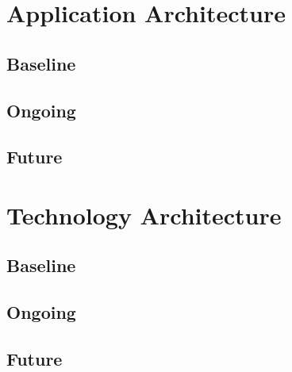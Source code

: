 \section{Application Architecture}
\subsection{Baseline}
\subsection{Ongoing}
\subsection{Future}


\section{Technology Architecture}
\subsection{Baseline}
\subsection{Ongoing}
\subsection{Future}



